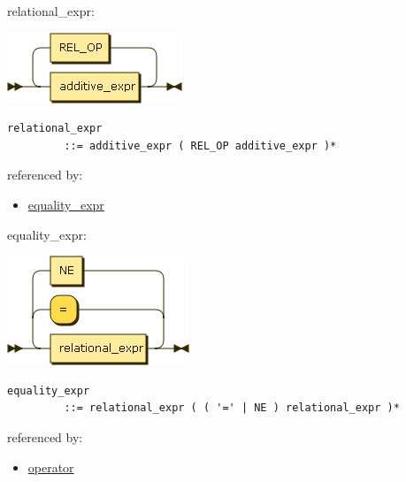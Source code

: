 \begin{minipage}{\textwidth}
\protect\hypertarget{relational_expr}{}{relational\_expr:}

\includegraphics[width=2.06250in,height=0.83333in]{diagram/relational_expr.png}

\begin{verbatim}
relational_expr
         ::= additive_expr ( REL_OP additive_expr )*
\end{verbatim}

referenced by:

\begin{itemize}
\tightlist
\item
  \protect\hyperlink{equality_expr}{equality\_expr}
\end{itemize}

\end{minipage}

\begin{minipage}{\textwidth}
\protect\hypertarget{equality_expr}{}{equality\_expr:}

\includegraphics[width=2.14583in,height=1.29167in]{diagram/equality_expr.png}

\begin{verbatim}
equality_expr
         ::= relational_expr ( ( '=' | NE ) relational_expr )*
\end{verbatim}

referenced by:

\begin{itemize}
\tightlist
\item
  \protect\hyperlink{operator}{operator}
\end{itemize}

\end{minipage}

